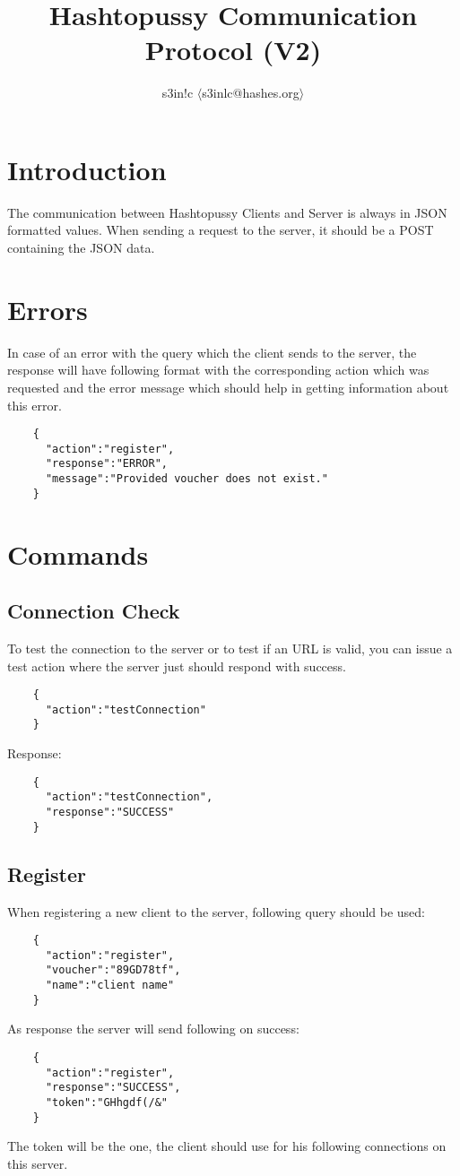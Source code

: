 \documentclass{article}
\author{s3in!c $\langle$s3inlc@hashes.org$\rangle$ }
\begin{document}
	\title{Hashtopussy Communication Protocol (V2)}
	\maketitle
	\section*{Introduction}
	The communication between Hashtopussy Clients and Server is always in JSON formatted values. When sending a request to the server, it should be a POST containing the JSON data.

	\section*{Errors}
	In case of an error with the query which the client sends to the server, the response will have following format with the corresponding action which was requested and the error message which should help in getting information about this error.
	\begin{verbatim}
	{
	  "action":"register",
	  "response":"ERROR",
	  "message":"Provided voucher does not exist."
	}
	\end{verbatim}
	\pagebreak
	\section*{Commands}
	
	\subsection*{Connection Check}
	To test the connection to the server or to test if an URL is valid, you can issue a test action where the server just should respond with success.
	\begin{verbatim}
	{
	  "action":"testConnection"
	}
	\end{verbatim}
	Response:
	\begin{verbatim}
	{
	  "action":"testConnection",
	  "response":"SUCCESS"
	} 
	\end{verbatim}

	\subsection*{Register}
	When registering a new client to the server, following query should be used:
	\begin{verbatim}
	{
	  "action":"register",
	  "voucher":"89GD78tf",
	  "name":"client name"
	}
	\end{verbatim}
	As response the server will send following on success:
	\begin{verbatim}
	{
	  "action":"register",
	  "response":"SUCCESS",
	  "token":"GHhgdf(/&"
	} 
	\end{verbatim}
	The token will be the one, the client should use for his following connections on this server.
	
\end{document}
